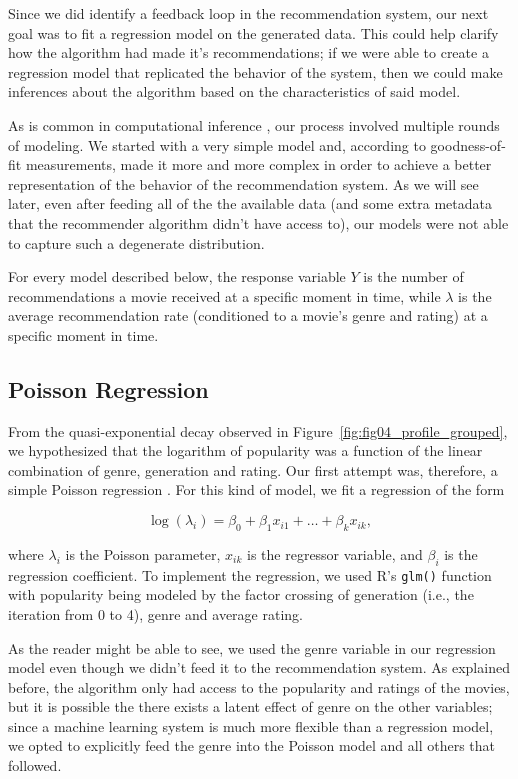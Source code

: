 Since we did identify a feedback loop in the recommendation system, our next
goal was to fit a regression model on the generated data. This could help
clarify how the algorithm had made it's recommendations; if we were able to
create a regression model that replicated the behavior of the system, then we
could make inferences about the algorithm based on the characteristics of said
model.

As is common in computational inference \citep{}, our process involved multiple %
rounds of modeling. We started with a very simple model and, according to
goodness-of-fit measurements, made it more and more complex in order to achieve
a better representation of the behavior of the recommendation system. As we will
see later, even after feeding all of the the available data (and some extra
metadata that the recommender algorithm didn't have access to), our models were
not able to capture such a degenerate distribution.

For every model described below, the response variable $Y$ is the number of
recommendations a movie received at a specific moment in time, while $\lambda$
is the average recommendation rate (conditioned to a movie's genre and rating)
at a specific moment in time.

\subsection{Poisson Regression}
\label{subsec:poisson04}

From the quasi-exponential decay observed in
Figure~\ref{fig:fig04_profile_grouped}, we hypothesized that the logarithm of
popularity was a function of the linear combination of genre, generation and
rating. Our first attempt was, therefore, a simple Poisson regression \citep{}. %
For this kind of model, we fit a regression of the form

$$
\log(\lambda_i) = \beta_0 + \beta_1 x_{i1} + \dots + \beta_k x_{ik},
$$

\noindent where $\lambda_i$ is the Poisson parameter, $x_{ik}$ is the regressor
variable, and $\beta_i$ is the regression coefficient. To implement the
regression, we used R's \verb|glm()| \citep{} function with popularity being
modeled by the factor crossing of generation (i.e., the iteration from 0 to 4),
genre and average rating.

As the reader might be able to see, we used the genre variable in our regression
model even though we didn't feed it to the recommendation system. As explained
before, the algorithm only had access to the popularity and ratings of the
movies, but it is possible the there exists a latent effect of genre on the
other variables; since a machine learning system is much more flexible than a
regression model, we opted to explicitly feed the genre into the Poisson model
and all others that followed.

